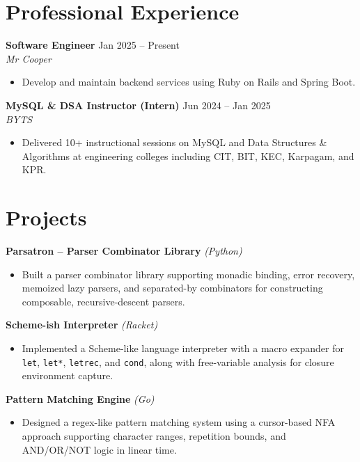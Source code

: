 \documentclass[10pt,letterpaper]{article}
\newcommand{\resumeItem}[1]{\item #1}
\newenvironment{resumeList}{\begin{itemize}[leftmargin=16pt, itemsep=0pt, topsep=1pt, parsep=0pt]}{\end{itemize}}
\newcommand{\resumeEntry}[4]{
  \textbf{#1} \hfill #2 \\
  \textit{#3} \hfill \textit{#4} \\[0pt]
}
\begin{document}
\section*{Professional Experience}

\resumeEntry{Software Engineer}{Jan 2025 -- Present}{Mr Cooper}{}
\begin{resumeList}
  \resumeItem{Develop and maintain backend services using Ruby on Rails and Spring Boot.}
\end{resumeList}

\vspace{1pt}
\resumeEntry{MySQL \& DSA Instructor (Intern)}{Jun 2024 -- Jan 2025}{BYTS}{}
\begin{resumeList}
  \resumeItem{Delivered 10+ instructional sessions on MySQL and Data Structures \& Algorithms at engineering colleges including CIT, BIT, KEC, Karpagam, and KPR.}
\end{resumeList}

\section*{Projects}

\textbf{Parsatron -- Parser Combinator Library} \textit{(Python)} \\[0pt]
\begin{resumeList}
  \resumeItem{Built a parser combinator library supporting monadic binding, error recovery, memoized lazy parsers, and separated-by combinators for constructing composable, recursive-descent parsers.}
\end{resumeList}

\vspace{1pt}
\textbf{Scheme-ish Interpreter} \textit{(Racket)} \\[0pt]
\begin{resumeList}
  \resumeItem{Implemented a Scheme-like language interpreter with a macro expander for \texttt{let}, \texttt{let*}, \texttt{letrec}, and \texttt{cond}, along with free-variable analysis for closure environment capture.}
\end{resumeList}

\vspace{1pt}
\textbf{Pattern Matching Engine} \textit{(Go)} \\[0pt]
\begin{resumeList}
  \resumeItem{Designed a regex-like pattern matching system using a cursor-based NFA approach supporting character ranges, repetition bounds, and AND/OR/NOT logic in linear time.}
\end{resumeList}
\end{document}
